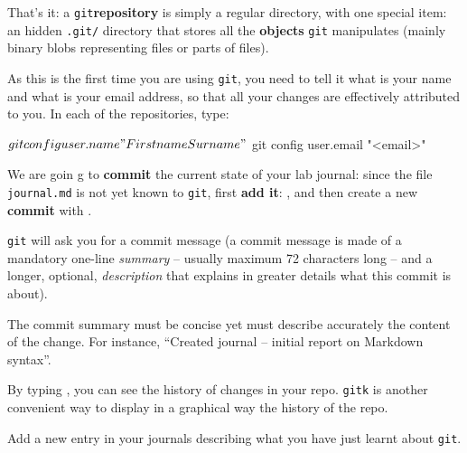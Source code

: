 \documentclass{instructions}
\newcommand{\git}{\texttt{git}\xspace}
\begin{document}
That's it: a \git \textbf{repository} is simply a regular directory, with one
special item: an hidden \texttt{.git/} directory that stores all the
\textbf{objects} \git manipulates (mainly binary blobs representing files or
parts of files).

As this is the first time you are using \git, you need to tell it what is your
name and what is your email address, so that all your changes are
effectively attributed to you. In each of the repositories, type:

\begin{shcode}
$ git config user.name "Firstname Surname"
$ git config user.email "<email>"
\end{shcode}



We are goin g to \textbf{commit} the current state of your lab journal: since
the file \texttt{journal.md} is
not yet known to \git, first \textbf{add it}: , and
then create a new \textbf{commit} with .

\git will ask you for a
commit message (a commit message is made of a mandatory one-line \emph{summary} --
usually maximum 72 characters long -- and a longer, optional, \emph{description} that explains
in greater details what this commit is about).

The commit summary must be concise yet must describe accurately the content of
the change. For instance, ``Created journal -- initial report on Markdown syntax''.


By typing , you can see the
history of changes in your repo. \texttt{gitk} is another
convenient way to display in a graphical way the history of the repo.



Add a new entry in your journals describing what you have just learnt about
\git.
\end{document}
